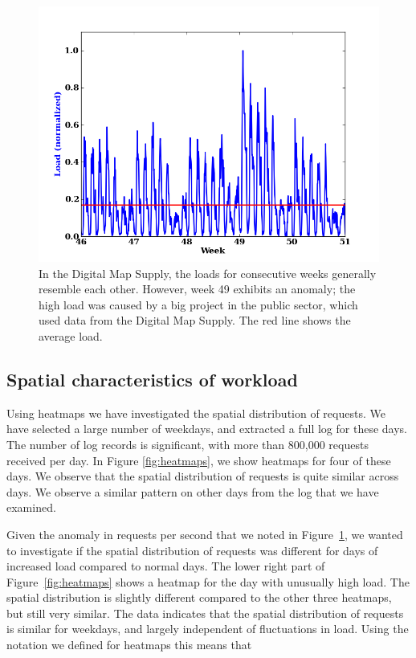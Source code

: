 \documentclass[11pt, oneside]{report}
\begin{document}
\begin{figure}
\centering
\includegraphics[scale=0.5]{figs-tileheat/anomaly.png}
\caption{In the Digital Map Supply, the loads for consecutive weeks generally resemble each other. However, week 49 exhibits an anomaly; the high load was caused by a big project in the public sector, which used data from the Digital Map Supply. The red line shows the average load.}
\label{fig:anomaly}
\end{figure}

\subsection{Spatial characteristics of workload}
\label{sec:spatial:characteristics}
Using heatmaps we have investigated the spatial distribution of requests. We have selected a large number of weekdays, and extracted a full log for these days. The number of log records is significant, with more than 800,000 requests received per day. In Figure \ref{fig:heatmaps}, we show heatmaps for four of these days. We observe that the spatial distribution of requests is quite similar across days. We observe a similar pattern on other days from the log that we have examined.

Given the anomaly in requests per second that we noted in Figure~\ref{fig:anomaly}, we wanted to investigate if the spatial distribution of requests was different for days of increased load compared to normal days. The lower right part of Figure~\ref{fig:heatmaps} shows a heatmap for the day with unusually high load. The spatial distribution is slightly different compared to the other three heatmaps, but still very similar. The data indicates that the spatial distribution of requests is similar for weekdays, and largely independent of fluctuations in load. Using the notation we defined for heatmaps this means that
\end{document}
